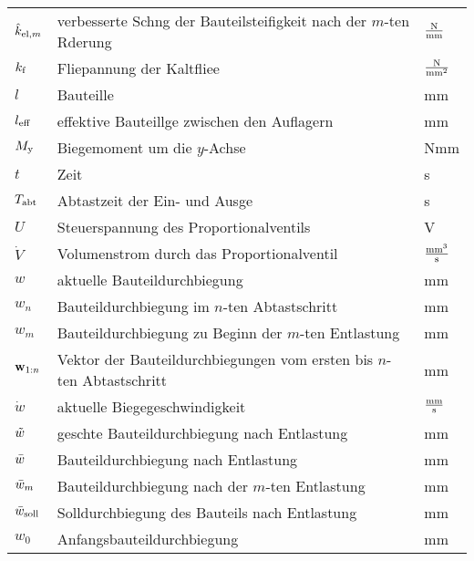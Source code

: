 \begin{longtable}{@{}l@{\qquad}p{}@{\quad}p{18mm}}
	$\hat{k}_{\mathrm{el},m}$ & verbesserte Schng der Bauteilsteifigkeit nach der $m$-ten Rderung & $\frac{\mathrm{N}}{\mathrm{mm}}$\\
	$k_{\mathrm{f}}$ & Fliepannung der Kaltfliee & $\frac{\mathrm{N}}{\mathrm{mm^2}}$\\
	$l$ & Bauteille & mm\\
	$l_{\mathrm{eff}}$ & effektive Bauteillge zwischen den Auflagern & mm\\
	$M_{\mathrm{y}}$ & Biegemoment um die $y$-Achse & Nmm\\
	$t$ & Zeit & s\\
	$T_{\mathrm{abt}}$ & Abtastzeit der Ein- und Ausge & s\\
	$U$ & Steuerspannung des Proportionalventils & V\\
	$\dot{V}$ & Volumenstrom durch das Proportionalventil & $\frac{\mathrm{mm^3}}{\mathrm{s}}$\\
	$w$ & aktuelle Bauteildurchbiegung & mm\\
	$w_n$ & Bauteildurchbiegung im $n$-ten Abtastschritt & mm\\
	$w_m$ & Bauteildurchbiegung zu Beginn der $m$-ten Entlastung & mm\\
	$\mathbf{w}_{1:n}$ & Vektor der Bauteildurchbiegungen vom ersten bis $n$-ten Abtastschritt & mm\\
	$\dot{w}$ & aktuelle Biegegeschwindigkeit & $\frac{\mathrm{mm}}{\mathrm{s}}$\\
	$\tilde{w}$ & geschte Bauteildurchbiegung nach Entlastung & mm\\
	$\bar{w}$ & Bauteildurchbiegung nach Entlastung & mm\\
	$\bar{w}_m$ & Bauteildurchbiegung nach der $m$-ten Entlastung & mm\\
	$\bar{w}_{\mathrm{soll}}$ & Solldurchbiegung des Bauteils nach Entlastung & mm\\
	$w_0$ & Anfangsbauteildurchbiegung & mm\\
\end{longtable}
